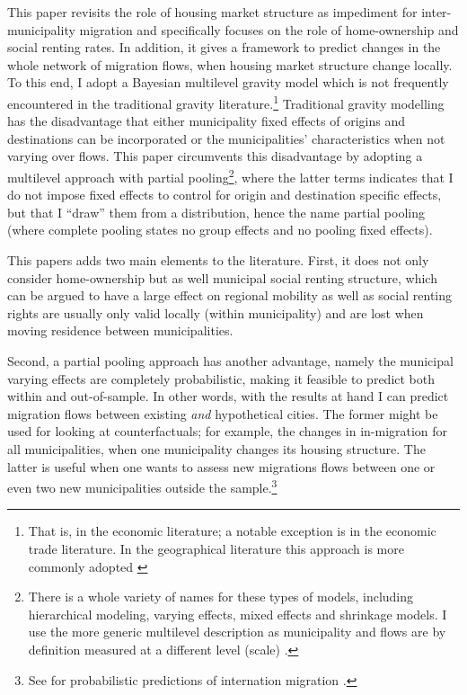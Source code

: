 \documentclass[fleqn,10pt]{SelfArx} %
\begin{document}
        This paper revisits the role of housing market structure as impediment
        for inter-municipality migration and specifically focuses on the role of
        home-ownership and social renting rates. In addition, it gives a
        framework to predict changes in the whole network of migration flows,
        when housing market structure change locally.  To this end, I adopt a
        Bayesian multilevel gravity model which is not frequently encountered in
        the traditional gravity literature.\footnote{That is, in the economic
          literature; a notable exception is \citet{ranjan2007bayesian} in the
          economic trade literature. In the geographical literature this
          approach is more commonly adopted \citep[see within a migration
          context][]{congdon2010random, congdon2012spatial}} Traditional gravity
        modelling has the disadvantage that either municipality fixed effects of
        origins and destinations can be incorporated or the municipalities'
        characteristics when not varying over flows. This paper circumvents this
        disadvantage by adopting a multilevel approach with partial
        pooling\footnote{There is a whole variety of names for these types of
          models, including hierarchical modeling, varying effects, mixed
          effects and shrinkage models. I use the more generic multilevel
          description as municipality and flows are by definition measured at a
          different level (scale) \citep[see][for an indepth
          discussion]{gelman2013bayesian}.}, where the latter terms indicates
        that I do not impose fixed effects to control for origin and destination
        specific effects, but that I ``draw'' them from a distribution, hence
        the name partial pooling (where complete pooling states no group effects
        and no pooling fixed effects).
               
        This papers adds two main elements to the literature. First, it does not
        only consider home-ownership but as well municipal social renting
        structure, which can be argued \citep[see, e.g.,][]{hughes1981council,
          boyle1997public,boyle1998migration} to have a large effect on regional
        mobility as well as social renting rights are usually only valid locally
        (within municipality) and are lost when moving residence between
        municipalities.
        
        Second, a partial pooling approach has another advantage, namely the
        municipal varying effects are completely probabilistic, making it
        feasible to predict both within and out-of-sample. In other words, with
        the results at hand I can predict migration flows between existing
        \emph{and} hypothetical cities. The former might be used for looking at
        counterfactuals; for example, the changes in in-migration for all
        municipalities, when one municipality changes its housing structure. The
        latter is useful when one wants to assess new migrations flows between
        one or even two new municipalities outside the sample.\footnote{See for
          probabilistic predictions of internation migration
          \cite{azose2015bayesian}.}
	
\end{document}
